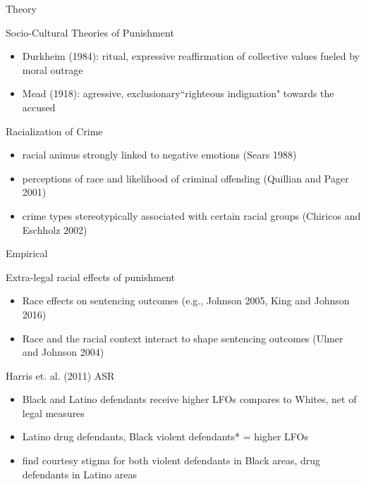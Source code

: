 \documentclass{beamer}
\begin{document}
\begin{frame}{Theory}
\begin{block}{Socio-Cultural Theories of Punishment}
\begin{itemize}
\item Durkheim (1984): ritual, expressive reaffirmation of collective values fueled by moral outrage
\item Mead (1918): agressive, exclusionary``righteous indignation" towards the accused
\end{itemize}
\end{block}

\begin{block}{Racialization of Crime}
\begin{itemize}
\item racial animus strongly linked to negative emotions (Sears 1988)
\item perceptions of race and likelihood of criminal offending (Quillian and Pager 2001)
\item crime types stereotypically associated with certain racial groups (Chiricos and Eschholz 2002)
\end{itemize}
\end{block}

\end{frame}


\begin{frame}{Empirical}
\begin{block}{Extra-legal racial effects of punishment}
\begin{itemize}
\item Race effects on sentencing outcomes (e.g., Johnson 2005, King and Johnson 2016)
\item Race and the racial context interact to shape sentencing outcomes (Ulmer and Johnson 2004)
\end{itemize}
\end{block}

\begin{block}{Harris et. al. (2011) ASR}
\begin{itemize}
\item Black and Latino defendants receive higher LFOs compares to Whites, net of legal measures
\item Latino drug defendants, Black violent defendants* = higher LFOs
\item find courtesy stigma for both violent defendants in Black areas, drug defendants in Latino areas
\end{itemize}
\end{block}

\end{frame}
\end{document}
